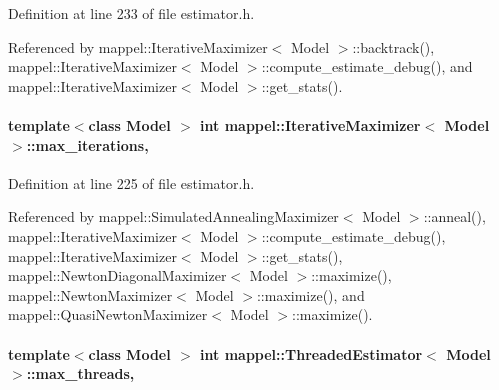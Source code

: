Definition at line 233 of file estimator.\+h.



Referenced by mappel\+::\+Iterative\+Maximizer$<$ Model $>$\+::backtrack(), mappel\+::\+Iterative\+Maximizer$<$ Model $>$\+::compute\+\_\+estimate\+\_\+debug(), and mappel\+::\+Iterative\+Maximizer$<$ Model $>$\+::get\+\_\+stats().

\paragraph[{\texorpdfstring{max\+\_\+iterations}{max_iterations}}]{\setlength{\rightskip}{0pt plus 5cm}template$<$class Model $>$ int {\bf mappel\+::\+Iterative\+Maximizer}$<$ Model $>$\+::max\+\_\+iterations\hspace{0.3cm}{\ttfamily [protected]}, {\ttfamily [inherited]}}\hypertarget{classmappel_1_1IterativeMaximizer_ac888935f332b069836a559f44cd267c7}{}\label{classmappel_1_1IterativeMaximizer_ac888935f332b069836a559f44cd267c7}


Definition at line 225 of file estimator.\+h.



Referenced by mappel\+::\+Simulated\+Annealing\+Maximizer$<$ Model $>$\+::anneal(), mappel\+::\+Iterative\+Maximizer$<$ Model $>$\+::compute\+\_\+estimate\+\_\+debug(), mappel\+::\+Iterative\+Maximizer$<$ Model $>$\+::get\+\_\+stats(), mappel\+::\+Newton\+Diagonal\+Maximizer$<$ Model $>$\+::maximize(), mappel\+::\+Newton\+Maximizer$<$ Model $>$\+::maximize(), and mappel\+::\+Quasi\+Newton\+Maximizer$<$ Model $>$\+::maximize().

\paragraph[{\texorpdfstring{max\+\_\+threads}{max_threads}}]{\setlength{\rightskip}{0pt plus 5cm}template$<$class Model $>$ int {\bf mappel\+::\+Threaded\+Estimator}$<$ Model $>$\+::max\+\_\+threads\hspace{0.3cm}{\ttfamily [protected]}, {\ttfamily [inherited]}}\hypertarget{classmappel_1_1ThreadedEstimator_a31391f8aaab3484f58bfdedbdb22be42}{}\label{classmappel_1_1ThreadedEstimator_a31391f8aaab3484f58bfdedbdb22be42}


